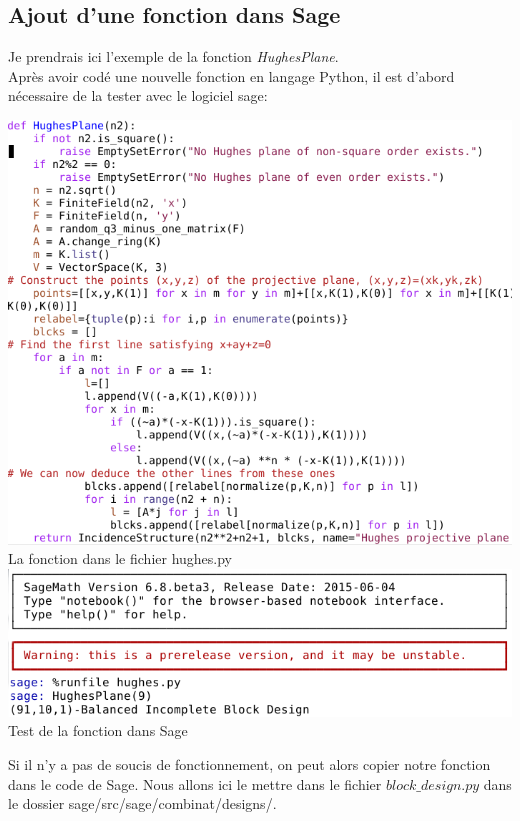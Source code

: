 \documentclass[a4paper]{article}
\begin{document}
\subsection{Ajout d'une fonction dans Sage}
Je prendrais ici l'exemple de la fonction \textit{HughesPlane}.\vspace{1\baselineskip}\\
Après avoir codé une nouvelle fonction en langage Python, il est d'abord nécessaire de la tester avec le logiciel sage:
\begin{center}
  \includegraphics[scale=0.7]{hughes.png}\\
  La fonction dans le fichier hughes.py
\vspace{1\baselineskip}\\
\includegraphics[scale=0.7]{hughessage.png}\vspace{1\baselineskip}\\
Test de la fonction dans Sage
\end{center}
Si il n'y a pas de soucis de fonctionnement, on peut alors copier notre fonction dans le code de Sage. Nous allons ici le mettre dans le fichier $block\_design.py$ dans le dossier sage/src/sage/combinat/designs/.
\end{document}
